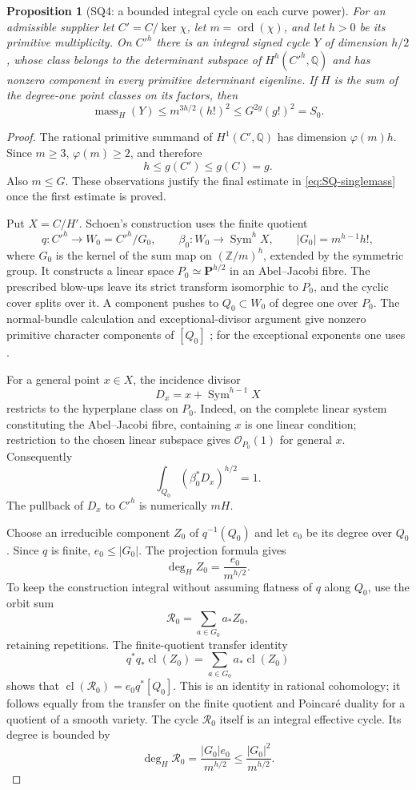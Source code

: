 \documentclass[11pt,a4paper]{article}
\newtheorem{proposition}[theorem]{Proposition}
\theoremstyle{definition}\newtheorem{definition}[theorem]{Definition}
\theoremstyle{remark}\newtheorem{remark}[theorem]{Remark}
\newcommand{\Q}{\mathbb Q}\newcommand{\Z}{\mathbb Z}\newcommand{\C}{\mathbb C}\newcommand{\R}{\mathbb R}
\newcommand{\cO}{\mathcal O}\newcommand{\CH}{\operatorname{CH}}\newcommand{\cl}{\operatorname{cl}}
\begin{document}
\begin{proposition}[SQ4: a bounded integral cycle on each curve power]\label{SQ4}
For an admissible supplier let $C'=C/\ker\chi$, let $m=\operatorname{ord}(\chi)$, and let $h>0$ be its primitive multiplicity. On $C'^h$ there is an integral signed cycle $Y$ of dimension $h/2$, whose class belongs to the determinant subspace of $H^h(C'^h,\Q)$ and has nonzero component in every primitive determinant eigenline. If $H$ is the sum of the degree-one point classes on its factors, then
\begin{equation}\label{eq:SQ-singlemass}
 \operatorname{mass}_H(Y)\le m^{3h/2}(h!)^2
                  \le G^{2g}(g!)^2=S_0.
\end{equation}
\end{proposition}
\begin{proof}
The rational primitive summand of $H^1(C',\Q)$ has dimension $\varphi(m)h$. Since $m\ge3$, $\varphi(m)\ge2$, and therefore
\[
 h\le g(C')\le g(C)=g.
\]
Also $m\le G$. These observations justify the final estimate in \eqref{eq:SQ-singlemass} once the first estimate is proved.

Put $X=C/H'$. Schoen's construction uses the finite quotient
\[
 q:C'^h\longrightarrow W_0=C'^h/G_0,
 \qquad \beta_0:W_0\longrightarrow\operatorname{Sym}^hX,
 \qquad |G_0|=m^{h-1}h!,
\]
where $G_0$ is the kernel of the sum map on $(\Z/m)^h$, extended by the symmetric group. It constructs a linear space $P_0\simeq\mathbf P^{h/2}$ in an Abel--Jacobi fibre. The prescribed blow-ups leave its strict transform isomorphic to $P_0$, and the cyclic cover splits over it. A component pushes to $Q_0\subset W_0$ of degree one over $P_0$. The normal-bundle calculation and exceptional-divisor argument give nonzero primitive character components of $[Q_0]$ \citep[Theorem~2.0, Lemmas~2.3--2.6, pp.~11--17]{Schoen88}; for the exceptional exponents one uses \citet[Section~4, Lemma \texttt{lem:schoenR}]{Severn26}.

For a general point $x\in X$, the incidence divisor
\[
 D_x=x+\operatorname{Sym}^{h-1}X
\]
restricts to the hyperplane class on $P_0$. Indeed, on the complete linear system constituting the Abel--Jacobi fibre, containing $x$ is one linear condition; restriction to the chosen linear subspace gives $\cO_{P_0}(1)$ for general $x$. Consequently
\[
 \int_{Q_0}(\beta_0^*D_x)^{h/2}=1.
\]
The pullback of $D_x$ to $C'^h$ is numerically $mH$.

Choose an irreducible component $Z_0$ of $q^{-1}(Q_0)$ and let $e_0$ be its degree over $Q_0$. Since $q$ is finite, $e_0\le|G_0|$. The projection formula gives
\[
 \deg_H Z_0=\frac{e_0}{m^{h/2}}.
\]
To keep the construction integral without assuming flatness of $q$ along $Q_0$, use the orbit sum
\[
 \mathcal R_0=\sum_{a\in G_0}a_*Z_0,
\]
retaining repetitions. The finite-quotient transfer identity
\[
 q^*q_*\cl(Z_0)=\sum_{a\in G_0}a_*\cl(Z_0)
\]
shows that $\cl(\mathcal R_0)=e_0q^*[Q_0]$. This is an identity in rational cohomology; it follows equally from the transfer on the finite quotient and Poincar\'e duality for a quotient of a smooth variety. The cycle $\mathcal R_0$ itself is an integral effective cycle. Its degree is bounded by
\[
 \deg_H\mathcal R_0
  =\frac{|G_0|e_0}{m^{h/2}}
  \le\frac{|G_0|^2}{m^{h/2}}.
\]


\end{proof}
\end{document}
